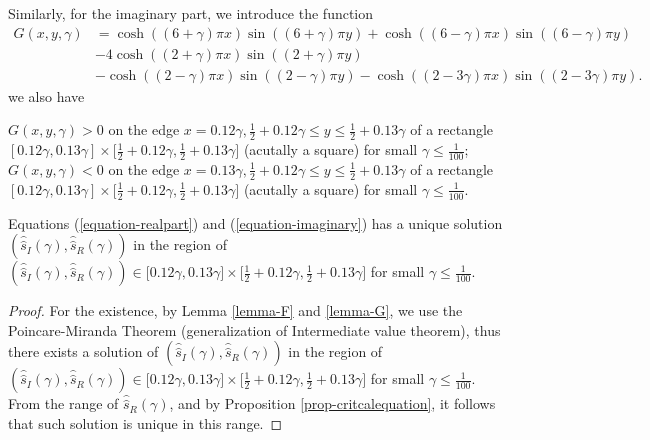 \documentclass[12pt]{amsart}
\begin{document}
Similarly, for the imaginary part,  we introduce the function
\begin{align}
   G(x,y,\gamma)&=\cosh((6+\gamma)\pi x)\sin((6+\gamma)\pi y)+\cosh((6-\gamma)\pi
x)\sin((6-\gamma)\pi y)\\\nonumber
&-4\cosh((2+\gamma)\pi x)\sin((2+\gamma)\pi y)\\\nonumber
&-\cosh((2-\gamma)\pi x)\sin((2-\gamma)\pi y)-\cosh((2-3\gamma)\pi
x)\sin((2-3\gamma)\pi y).
\end{align}
we also have
\begin{lemma} \label{lemma-G}
$G(x,y,\gamma)>0$ on the edge $x=0.12\gamma,\frac{1}{2}+0.12\gamma\leq y\leq\frac
{1}{2}+0.13\gamma$ of a rectangle $[0.12\gamma,0.13\gamma]\times\lbrack
\frac{1}{2}+0.12\gamma,\frac{1}{2}+0.13\gamma]$ (acutally a square) for small
$\gamma\leq\frac{1}{100}$;
$G(x,y,\gamma)<0$ on the edge $x=0.13\gamma,\frac{1}{2}+0.12\gamma\leq y\leq\frac
{1}{2}+0.13\gamma$ of a rectangle $[0.12\gamma,0.13\gamma]\times\lbrack
\frac{1}{2}+0.12\gamma,\frac{1}{2}+0.13\gamma]$ (acutally a square) for small
$\gamma\leq\frac{1}{100}$.
\end{lemma}



\begin{proposition} \label{prop-range}
Equations (\ref{equation-realpart}) and (\ref{equation-imaginary}) has a unique solution $(\widehat{\widehat{s}}_{I}(\gamma),\widehat{\widehat
{s}}_{R}(\gamma))$ in the region of $(\widehat{\widehat{s}}_{I}(\gamma
),\widehat{\widehat{s}}_{R}(\gamma))\in\lbrack0.12\gamma,0.13\gamma
]\times\lbrack\frac{1}{2}+0.12\gamma,\frac{1}{2}+0.13\gamma]$ for small
$\gamma\leq\frac{1}{100}$.
\end{proposition}
\begin{proof}
For the existence, by Lemma \ref{lemma-F} and \ref{lemma-G}, we use the Poincare-Miranda Theorem
(generalization of Intermediate value theorem),
thus there exists a solution of $(\widehat{\widehat{s}}_{I}(\gamma
),\widehat{\widehat{s}}_{R}(\gamma))$ in the region of $(\widehat{\widehat{s}%
}_{I}(\gamma),\widehat{\widehat{s}}_{R}(\gamma))\in\lbrack0.12\gamma
,0.13\gamma]\times\lbrack\frac{1}{2}+0.12\gamma,\frac{1}{2}+0.13\gamma]$ for
small $\gamma\leq\frac{1}{100}$. 
From the range of $\widehat{\widehat{s}}_R(\gamma)$, and by Proposition \ref{prop-critcalequation}, it follows that such  solution is unique in this range. 

\end{proof}
\end{document}
